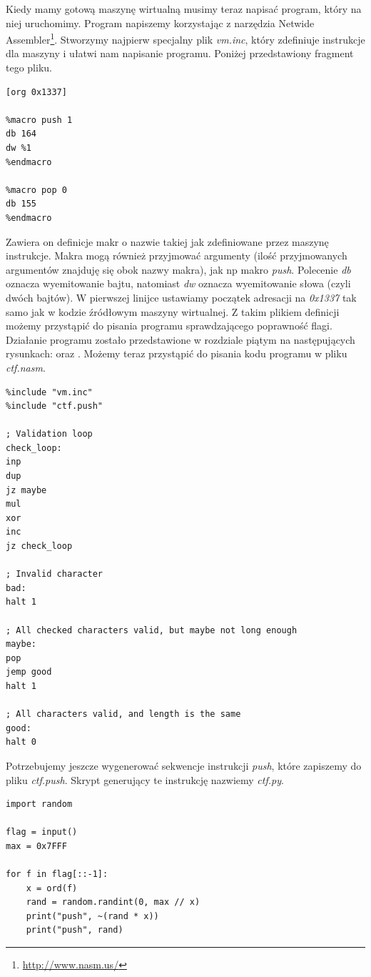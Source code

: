 \documentclass[language=polish,type=eng]{aghmodern}
\begin{document}
Kiedy mamy gotową maszynę wirtualną musimy teraz napisać program, który na niej
uruchomimy. Program napiszemy korzystając z narzędzia Netwide Assembler\footnote{
\url{http://www.nasm.us/}}. Stworzymy najpierw specjalny plik \emph{vm.inc}, który
zdefiniuje instrukcje dla maszyny i ułatwi nam napisanie programu. Poniżej
przedstawiony fragment tego pliku.

\begin{verbatim}
[org 0x1337]

%macro push 1
db 164
dw %1
%endmacro

%macro pop 0
db 155
%endmacro
\end{verbatim}

Zawiera on definicje makr o nazwie takiej jak zdefiniowane przez maszynę instrukcje.
Makra mogą również przyjmować argumenty (ilość przyjmowanych argumentów znajduję się
obok nazwy makra), jak np makro \emph{push}. Polecenie \emph{db} oznacza wyemitowanie bajtu,
natomiast \emph{dw} oznacza wyemitowanie słowa (czyli dwóch bajtów). W pierwszej linijce
ustawiamy początek adresacji na \emph{0x1337} tak samo jak w kodzie źródłowym
maszyny wirtualnej. Z takim plikiem definicji możemy przystąpić do pisania programu
sprawdzającego poprawność flagi. Działanie programu zostało przedstawione w rozdziale piątym
na następujących rysunkach:  oraz .
Możemy teraz przystąpić do pisania kodu programu w pliku \emph{ctf.nasm}.

\begin{verbatim}
%include "vm.inc"
%include "ctf.push"

; Validation loop
check_loop:
inp
dup
jz maybe
mul
xor
inc
jz check_loop

; Invalid character
bad:
halt 1

; All checked characters valid, but maybe not long enough
maybe:
pop
jemp good
halt 1

; All characters valid, and length is the same
good:
halt 0
\end{verbatim}

Potrzebujemy jeszcze wygenerować sekwencje instrukcji \emph{push}, które zapiszemy
do pliku \emph{ctf.push}. Skrypt generujący te instrukcję nazwiemy \emph{ctf.py}.

\begin{verbatim}
import random

flag = input()
max = 0x7FFF

for f in flag[::-1]:
    x = ord(f)
    rand = random.randint(0, max // x)
    print("push", ~(rand * x))
    print("push", rand)
\end{verbatim}
\end{document}
